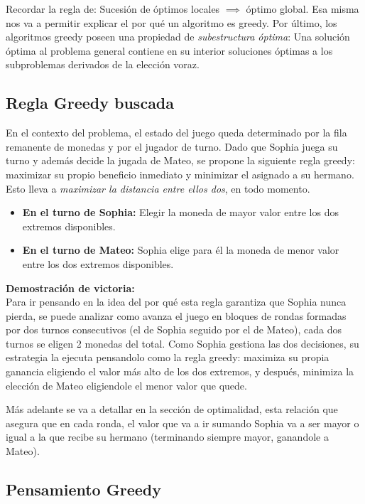 Recordar la regla de: Sucesión de óptimos locales $\implies$
 óptimo global. Esa misma nos va a permitir explicar el por qué un algoritmo es greedy. 
Por último, los algoritmos greedy poseen una propiedad de \textit{subestructura óptima}: Una solución óptima al problema general contiene en su interior soluciones óptimas a los subproblemas derivados de la elección voraz.

\subsection{Regla Greedy buscada}

En el contexto del problema, el estado del juego queda determinado por la fila remanente de monedas y por el jugador de turno. Dado que Sophia juega su turno y además decide la jugada de Mateo, se propone la siguiente regla greedy: maximizar su propio beneficio inmediato y minimizar el asignado a su hermano. Esto lleva a \textit{maximizar la distancia entre ellos dos}, en todo momento.
\begin{itemize}
    \item \textbf{En el turno de Sophia:} Elegir la moneda de mayor valor entre los dos extremos disponibles.
    \item \textbf{En el turno de Mateo:} Sophia elige para él la moneda de menor valor entre los dos extremos disponibles.
\end{itemize}

\noindent\textbf{Demostración de victoria:} \\
Para ir pensando en la idea del por qué esta regla garantiza que Sophia nunca pierda, se puede analizar como avanza el juego en bloques de rondas formadas por dos turnos consecutivos (el de Sophia seguido por el de Mateo), cada dos turnos se eligen 2 monedas del total. 
Como Sophia gestiona las dos decisiones, su estrategia la ejecuta pensandolo como la regla greedy: maximiza su propia ganancia eligiendo el valor más alto de los dos extremos, y después, minimiza la elección de Mateo eligiendole el menor valor que quede.

Más adelante se va a detallar en la sección de optimalidad, esta relación que asegura que en cada ronda, el valor que va a ir sumando Sophia va a ser mayor o igual a la que recibe su hermano (terminando siempre mayor, ganandole a Mateo). 

\subsection{Pensamiento Greedy}

